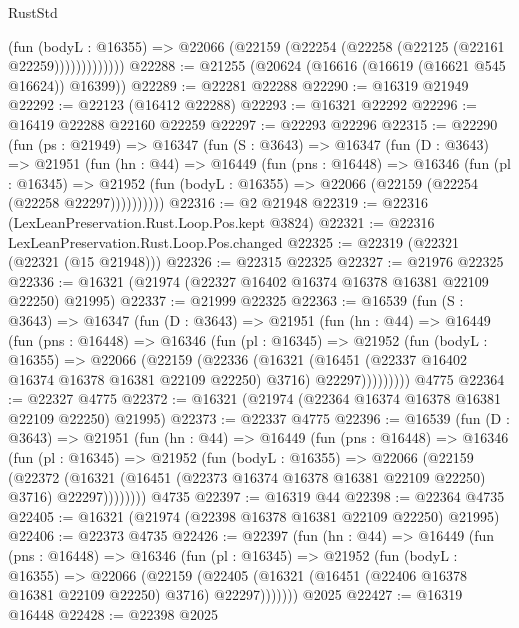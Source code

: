 \begin{lexlean}{RustStd}
\begin{coremodule}
                  (fun (bodyL : @16355) =>
                  @22066 (@22159 (@22254 (@22258 (@22125 (@22161 @22259)))))))))))))
@22288 := @21255 (@20624 (@16616 (@16619 (@16621 @545 @16624)) @16399))
@22289 := @22281 @22288
@22290 := @16319 @21949
@22292 := @22123 (@16412 @22288)
@22293 := @16321 @22292
@22296 := @16419 @22288 @22160 @22259
@22297 := @22293 @22296
@22315 := @22290
    (fun (ps : @21949) =>
    @16347
      (fun (S : @3643) =>
      @16347
        (fun (D : @3643) =>
        @21951
          (fun (hn : @44) =>
          @16449
            (fun (pns : @16448) =>
            @16346
              (fun (pl : @16345) =>
              @21952 (fun (bodyL : @16355) => @22066 (@22159 (@22254 (@22258 @22297))))))))))
@22316 := @2 @21948
@22319 := @22316 (LexLeanPreservation.Rust.Loop.Pos.kept @3824)
@22321 := @22316 LexLeanPreservation.Rust.Loop.Pos.changed
@22325 := @22319 (@22321 (@22321 (@15 @21948)))
@22326 := @22315 @22325
@22327 := @21976 @22325
@22336 := @16321 (@21974 (@22327 @16402 @16374 @16378 @16381 @22109 @22250) @21995)
@22337 := @21999 @22325
@22363 := @16539
    (fun (S : @3643) =>
    @16347
      (fun (D : @3643) =>
      @21951
        (fun (hn : @44) =>
        @16449
          (fun (pns : @16448) =>
          @16346
            (fun (pl : @16345) =>
            @21952
              (fun (bodyL : @16355) =>
              @22066
                (@22159
                  (@22336
                    (@16321
                      (@16451 (@22337 @16402 @16374 @16378 @16381 @22109 @22250) @3716)
                      @22297)))))))))
    @4775
@22364 := @22327 @4775
@22372 := @16321 (@21974 (@22364 @16374 @16378 @16381 @22109 @22250) @21995)
@22373 := @22337 @4775
@22396 := @16539
    (fun (D : @3643) =>
    @21951
      (fun (hn : @44) =>
      @16449
        (fun (pns : @16448) =>
        @16346
          (fun (pl : @16345) =>
          @21952
            (fun (bodyL : @16355) =>
            @22066
              (@22159
                (@22372
                  (@16321 (@16451 (@22373 @16374 @16378 @16381 @22109 @22250) @3716) @22297))))))))
    @4735
@22397 := @16319 @44
@22398 := @22364 @4735
@22405 := @16321 (@21974 (@22398 @16378 @16381 @22109 @22250) @21995)
@22406 := @22373 @4735
@22426 := @22397
    (fun (hn : @44) =>
    @16449
      (fun (pns : @16448) =>
      @16346
        (fun (pl : @16345) =>
        @21952
          (fun (bodyL : @16355) =>
          @22066
            (@22159
              (@22405 (@16321 (@16451 (@22406 @16378 @16381 @22109 @22250) @3716) @22297)))))))
    @2025
@22427 := @16319 @16448
@22428 := @22398 @2025

\end{coremodule}
\end{lexlean}
